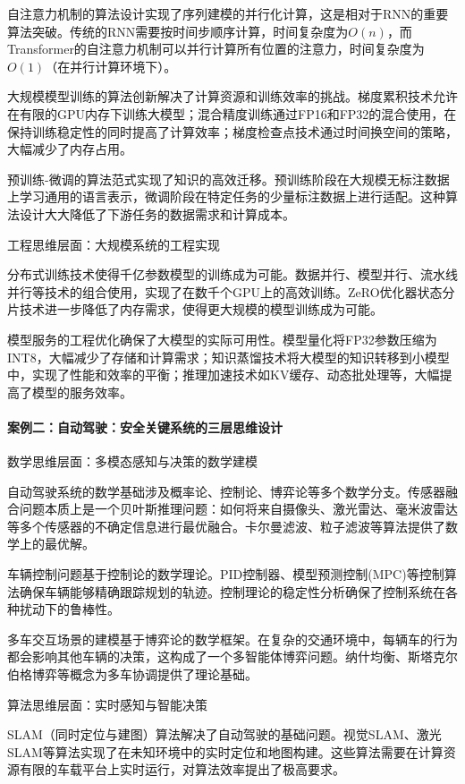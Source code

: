 自注意力机制的算法设计实现了序列建模的并行化计算，这是相对于RNN的重要算法突破。传统的RNN需要按时间步顺序计算，时间复杂度为$O(n)$，而Transformer的自注意力机制可以并行计算所有位置的注意力，时间复杂度为$O(1)$（在并行计算环境下）。

大规模模型训练的算法创新解决了计算资源和训练效率的挑战。梯度累积技术允许在有限的GPU内存下训练大模型；混合精度训练通过FP16和FP32的混合使用，在保持训练稳定性的同时提高了计算效率；梯度检查点技术通过时间换空间的策略，大幅减少了内存占用。

预训练-微调的算法范式实现了知识的高效迁移。预训练阶段在大规模无标注数据上学习通用的语言表示，微调阶段在特定任务的少量标注数据上进行适配。这种算法设计大大降低了下游任务的数据需求和计算成本。

工程思维层面：大规模系统的工程实现

分布式训练技术使得千亿参数模型的训练成为可能。数据并行、模型并行、流水线并行等技术的组合使用，实现了在数千个GPU上的高效训练。ZeRO优化器状态分片技术进一步降低了内存需求，使得更大规模的模型训练成为可能。

模型服务的工程优化确保了大模型的实际可用性。模型量化将FP32参数压缩为INT8，大幅减少了存储和计算需求；知识蒸馏技术将大模型的知识转移到小模型中，实现了性能和效率的平衡；推理加速技术如KV缓存、动态批处理等，大幅提高了模型的服务效率。

\paragraph{案例二：自动驾驶：安全关键系统的三层思维设计}

数学思维层面：多模态感知与决策的数学建模

自动驾驶系统的数学基础涉及概率论、控制论、博弈论等多个数学分支。传感器融合问题本质上是一个贝叶斯推理问题：如何将来自摄像头、激光雷达、毫米波雷达等多个传感器的不确定信息进行最优融合。卡尔曼滤波、粒子滤波等算法提供了数学上的最优解。

车辆控制问题基于控制论的数学理论。PID控制器、模型预测控制(MPC)等控制算法确保车辆能够精确跟踪规划的轨迹。控制理论的稳定性分析确保了控制系统在各种扰动下的鲁棒性。

多车交互场景的建模基于博弈论的数学框架。在复杂的交通环境中，每辆车的行为都会影响其他车辆的决策，这构成了一个多智能体博弈问题。纳什均衡、斯塔克尔伯格博弈等概念为多车协调提供了理论基础。

算法思维层面：实时感知与智能决策

SLAM（同时定位与建图）算法解决了自动驾驶的基础问题。视觉SLAM、激光SLAM等算法实现了在未知环境中的实时定位和地图构建。这些算法需要在计算资源有限的车载平台上实时运行，对算法效率提出了极高要求。


